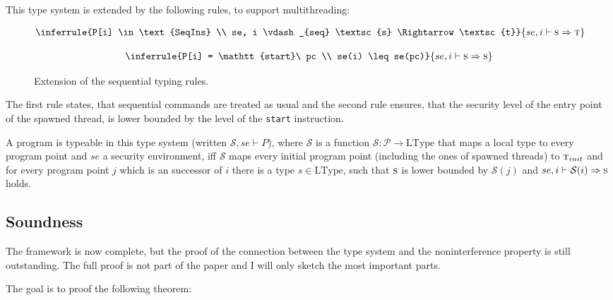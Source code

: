 \documentclass[a4paper,10pt]{llncs}
\begin{document}
This type system is extended by the following rules, to support multithreading:

\begin{figure}
\begin{minipage}{.5\textwidth}
\begin{align*}
\inferrule{P[i] \in \text{SeqIns} \\ se, i \vdash_{seq} \textsc{s} \Rightarrow \textsc{t}}
{se, i \vdash \textsc{s} \Rightarrow \textsc{t}}
\end{align*}
\end{minipage}
\begin{minipage}{.5\textwidth}
\begin{align*}
\inferrule{P[i] = \mathtt{start}\ pc \\ se(i) \leq se(pc)}
{se, i \vdash \textsc{s} \Rightarrow \textsc{s}}
\end{align*}
\end{minipage}
\caption{Extension of the sequential typing rules.}
\label{fig:multithreaded-typing-rules}
\end{figure}

The first rule states, that sequential commands are treated as usual
and the second rule ensures, that the security level of the entry point
of the spawned thread, is lower bounded by the level of the \texttt{start}
instruction.

A program is typeable in this type system (written $\mathcal{S}, se \vdash P$),
where $\mathcal{S}$ is a function $\mathcal{S}: \mathcal{P} \rightarrow \text{LType}$
that maps a local type to every program point
and $se$ a security environment, iff $\mathcal{S}$ maps every initial program point
(including the ones of spawned threads) to $\textsc{t}_{init}$ and for every program point $j$ which is an
successor of $i$ there is a type $s \in \text{LType}$, such that $\textsc{s}$ is lower bounded
by $\mathcal{S}(j)$ and $se, i \vdash \mathcal{S}(i) \Rightarrow \textsc{s}$ holds.


\subsection{Soundness}
\label{sec:soundness}
The framework is now complete, but the proof of the connection between the
type system and the noninterference property is still outstanding. The full
proof is not part of the paper and I will only sketch the most important
parts.

The goal is to proof the following theorem:
\end{document}

